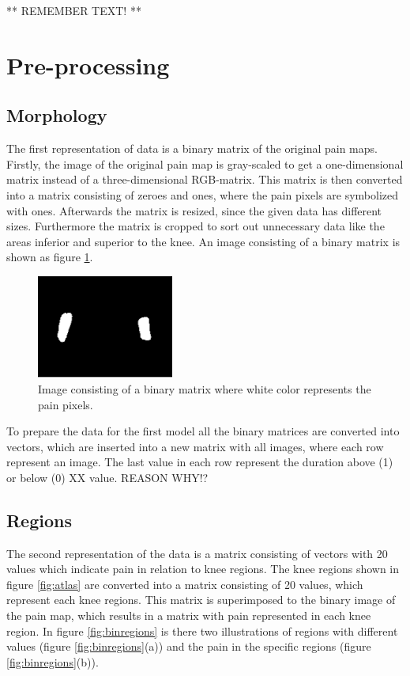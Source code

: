 ** REMEMBER TEXT! **

\section{Pre-processing}

\subsection{Morphology} \label{sec:Morph}
The first representation of data is a binary matrix of the original pain maps. 
Firstly, the image of the original pain map is gray-scaled to get a one-dimensional matrix instead of a three-dimensional RGB-matrix. This matrix is then converted into a matrix consisting of zeroes and ones, where the pain pixels are symbolized with ones. Afterwards the matrix is resized, since the given data has different sizes. Furthermore the matrix is cropped to sort out unnecessary data like the areas inferior and superior to the knee. An image consisting of a binary matrix is shown as figure \ref{fig:cropbin7}.

\begin{figure} [H]
\centering
\includegraphics[width=0.4\textwidth]{figures/cropbin7}
\caption{Image consisting of a binary matrix where white color represents the pain pixels.}
\label{fig:cropbin7}
\end{figure}

\noindent
To prepare the data for the first model all the binary matrices are converted into vectors, which are inserted into a new matrix with all images, where each row represent an image. The last value in each row represent the duration above (1) or below (0) XX value. REASON WHY!?

\subsection{Regions}
The second representation of the data is a matrix consisting of vectors with 20 values which indicate pain in relation to knee regions. 
The knee regions shown in figure \ref{fig:atlas} are converted into a matrix consisting of 20 values, which represent each knee regions. This matrix is superimposed to the binary image of the pain map, which results in a matrix with pain represented in each knee region. In figure \ref{fig:binregions} is there two illustrations of regions with different values (figure \ref{fig:binregions}(a)) and the pain in the specific regions (figure \ref{fig:binregions}(b)).

